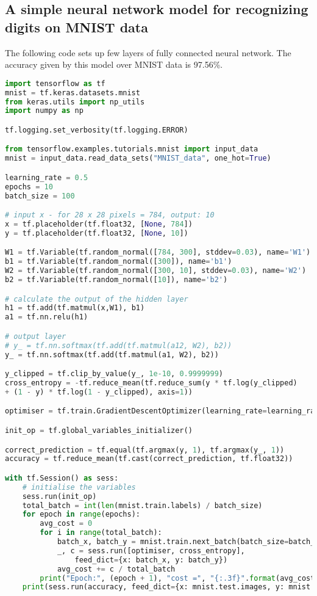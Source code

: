 \documentclass[letterpaper]{article}
\begin{document}
\newpage
\begin{appendices}
	
\section{A simple neural network model for recognizing digits on MNIST data}

The following code sets up few layers of fully connected neural network. The accuracy given by this model over MNIST data is 97.56\%.\\

\begin{lstlisting}[language=python]
import tensorflow as tf
mnist = tf.keras.datasets.mnist
from keras.utils import np_utils
import numpy as np

tf.logging.set_verbosity(tf.logging.ERROR)

from tensorflow.examples.tutorials.mnist import input_data
mnist = input_data.read_data_sets("MNIST_data", one_hot=True)

learning_rate = 0.5
epochs = 10
batch_size = 100

# input x - for 28 x 28 pixels = 784, output: 10
x = tf.placeholder(tf.float32, [None, 784])
y = tf.placeholder(tf.float32, [None, 10])

W1 = tf.Variable(tf.random_normal([784, 300], stddev=0.03), name='W1')
b1 = tf.Variable(tf.random_normal([300]), name='b1')
W2 = tf.Variable(tf.random_normal([300, 10], stddev=0.03), name='W2')
b2 = tf.Variable(tf.random_normal([10]), name='b2')

# calculate the output of the hidden layer
h1 = tf.add(tf.matmul(x,W1), b1)
a1 = tf.nn.relu(h1)

# output layer
# y_ = tf.nn.softmax(tf.add(tf.matmul(a12, W2), b2))
y_ = tf.nn.softmax(tf.add(tf.matmul(a1, W2), b2))

y_clipped = tf.clip_by_value(y_, 1e-10, 0.9999999)
cross_entropy = -tf.reduce_mean(tf.reduce_sum(y * tf.log(y_clipped)
+ (1 - y) * tf.log(1 - y_clipped), axis=1))

optimiser = tf.train.GradientDescentOptimizer(learning_rate=learning_rate).minimize(cross_entropy)

init_op = tf.global_variables_initializer()

correct_prediction = tf.equal(tf.argmax(y, 1), tf.argmax(y_, 1))
accuracy = tf.reduce_mean(tf.cast(correct_prediction, tf.float32))

with tf.Session() as sess:
	# initialise the variables
	sess.run(init_op)
	total_batch = int(len(mnist.train.labels) / batch_size)
	for epoch in range(epochs):
		avg_cost = 0
		for i in range(total_batch):
			batch_x, batch_y = mnist.train.next_batch(batch_size=batch_size)
			_, c = sess.run([optimiser, cross_entropy], 
				feed_dict={x: batch_x, y: batch_y})
			avg_cost += c / total_batch
		print("Epoch:", (epoch + 1), "cost =", "{:.3f}".format(avg_cost))
	print(sess.run(accuracy, feed_dict={x: mnist.test.images, y: mnist.test.labels}))


\end{lstlisting}
\end{appendices}
\end{document}
